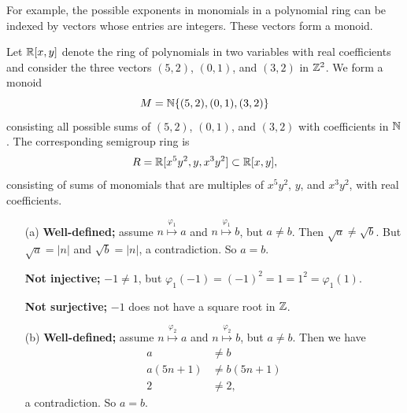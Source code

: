 \documentclass[../UNABRIDGEDalgebraNotesMSRI-UP2016.tex]{subfiles}
\begin{document}
\begin{frame}
For example, the possible exponents in monomials in a polynomial ring can be indexed by vectors whose entries are integers.  These vectors form a monoid.

\smallGap
\begin{ex}\label{ex:semigroupRings}
Let $\mathbb R[x,y]$ denote the ring of polynomials in two variables with real coefficients and consider the three vectors $(5,2)$, $(0,1)$, and $(3,2)$ in $\mathbb Z^2$.  We form a monoid 
\[
M=\mathbb N\{(5,2),(0,1),(3,2)\}
\]
consisting all possible sums of $(5,2)$, $(0,1)$, and $(3,2)$ with coefficients in $\mathbb N$.  The corresponding semigroup ring is 
\[
R=\mathbb R[x^5y^2,y,x^3y^2]\subset \mathbb R[x,y],
\]
consisting of sums of monomials that are multiples of $x^5y^2$, $y$, and $x^3y^2$, with real coefficients.
\end{ex}
\end{frame}

\answerKey
\begin{frame}{\subsecname}
\begin{itemize}
\item[(a)] \textbf{Well-defined;} assume $n\overset{\varphi_1}{\longmapsto} a$ and $n\overset{\varphi_1}{\longmapsto} b$, but $a\neq b$.  Then $\sqrt a\neq \sqrt b$.  But $\sqrt a=|n|$ and $\sqrt b=|n|$, a contradiction.  So $a=b$.

\smallGap
\textbf{Not injective;} $-1\neq 1$, but $\varphi_1(-1)=(-1)^2=1=1^2=\varphi_1(1)$.

\smallGap
\textbf{Not surjective;} $-1$ does not have a square root in $\mathbb Z$.

\smallGap
\item[(b)] \textbf{Well-defined;} assume $n\overset{\varphi_2}{\longmapsto} a$ and $n\overset{\varphi_2}{\longmapsto}b$, but $a\neq b$.  Then we have
\begin{align*}
a &\neq b \\
a(5n+1) &\neq b(5n+1) \\
2 & \neq 2,
\end{align*}
a contradiction.  So $a=b$.
\end{itemize}
\end{frame}
\end{document}
